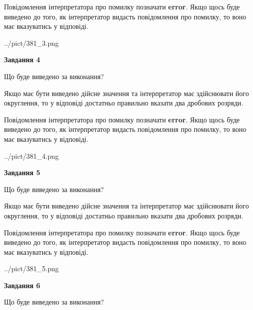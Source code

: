 \documentclass[12pt, ukrainian]{article}
\begin{document}
{\begin {Large}
Повідомлення інтерпретатора про помилку позначати \textbf{error}.
Якщо щось буде виведено до того, як інтерпретатор видасть повідомлення про помилку, 
то воно має вказуватись у відповіді. \par

\begin{center}
	{../pict/381_3.png}
\end{center}
\newpage

{\begin {center}\textbf{Завдання 4}\end {center}}\par
Що буде виведено за виконання? \par

Якщо має бути виведено дійсне значення та інтерпретатор має здійснювати його округлення, 
то у відповіді достатньо правильно вказати два дробових розряди.

Повідомлення інтерпретатора про помилку позначати \textbf{error}.
Якщо щось буде виведено до того, як інтерпретатор видасть повідомлення про помилку, 
то воно має вказуватись у відповіді. \par

\begin{center}
	{../pict/381_4.png}
\end{center}
\newpage

{\begin {center}\textbf{Завдання 5}\end {center}}\par
Що буде виведено за виконання? \par

Якщо має бути виведено дійсне значення та інтерпретатор має здійснювати його округлення, 
то у відповіді достатньо правильно вказати два дробових розряди.

Повідомлення інтерпретатора про помилку позначати \textbf{error}.
Якщо щось буде виведено до того, як інтерпретатор видасть повідомлення про помилку, 
то воно має вказуватись у відповіді. \par

\begin{center}
	{../pict/381_5.png}
\end{center}
\newpage

{\begin {center}\textbf{Завдання 6}\end {center}}\par
Що буде виведено за виконання? \par


\end{Large}}
\end{document}
